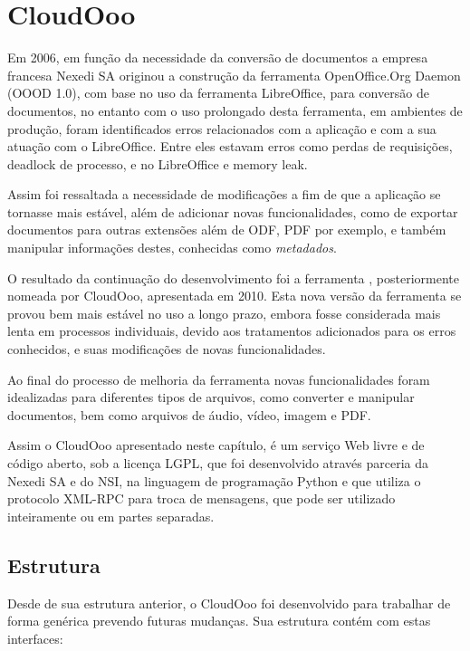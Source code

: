 \chapter{CloudOoo}

Em 2006, em função da necessidade da conversão de documentos a empresa francesa Nexedi SA originou a construção da ferramenta OpenOffice.Org Daemon (OOOD 1.0), com base no uso da ferramenta LibreOffice, para conversão de documentos, no entanto com o uso prolongado desta ferramenta, em ambientes de produção, foram identificados erros relacionados com a aplicação e com a sua atuação com o LibreOffice. Entre eles estavam erros como perdas de requisições, deadlock de processo, e no LibreOffice e memory leak.

Assim foi ressaltada a necessidade de modificações a fim de que a aplicação se tornasse mais estável, além de adicionar novas funcionalidades, como de exportar documentos para outras extensões além de ODF, PDF por exemplo, e também manipular informações destes, conhecidas como \textit{metadados}.

O resultado da continuação do desenvolvimento foi a ferramenta , posteriormente nomeada por CloudOoo, apresentada em 2010. Esta nova versão da ferramenta se provou bem mais estável no uso a longo prazo, embora fosse considerada mais lenta em processos individuais, devido aos tratamentos adicionados para os erros conhecidos, e suas modificações de novas funcionalidades.

Ao final do processo de melhoria da ferramenta novas funcionalidades foram idealizadas para diferentes tipos de arquivos, como converter e manipular documentos, bem como arquivos de áudio, vídeo, imagem e PDF.

Assim o CloudOoo apresentado neste capítulo, é um serviço Web livre e de código aberto, sob a licença LGPL, que foi desenvolvido através parceria da Nexedi SA e do NSI, na linguagem de programação Python e que utiliza o protocolo XML-RPC para troca de mensagens, que pode ser utilizado inteiramente ou em partes separadas.

\section{Estrutura}

Desde de sua estrutura anterior, o CloudOoo foi desenvolvido para trabalhar de forma genérica prevendo futuras mudanças. Sua estrutura contém com estas interfaces:

